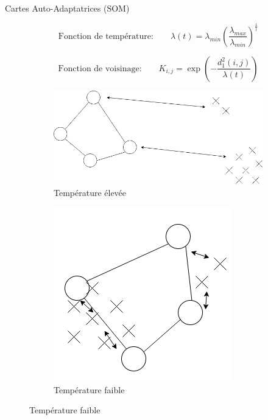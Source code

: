 \documentclass[hyperref={pdfpagelabels=false}]{beamer}
\begin{document}
        \begin{frame}{Cartes Auto-Adaptatrices (SOM)}
            \begin{center}
                
            \end{center}
            \begin{equation*}
                \text{Fonction de température:} \qquad
                \lambda(t) = 
                \lambda_{min}\left(\frac{\lambda_{max}}{\lambda_{min}}\right)^{\frac{1}{t}}
            \end{equation*}

            
            \begin{equation*}
                \text{Fonction de voisinage:} \qquad K_{i,j} = 
                \exp\left(-\frac{d^2_1(i,j)}{\lambda(t)}\right)
            \end{equation*}

            \begin{figure}[b]
                \centering
                \begin{subfigure}[b]{0.45\textwidth}
                    \centering
                    \includegraphics[scale=.20]{somhot}
                    \caption{Température élevée}
                \end{subfigure}
                \begin{subfigure}[b]{0.45\textwidth}
                    \centering
                    \includegraphics[scale=.25]{somcold}
                    \caption{Température faible}
                \end{subfigure}
            \end{figure}
        \end{frame}
\end{document}
